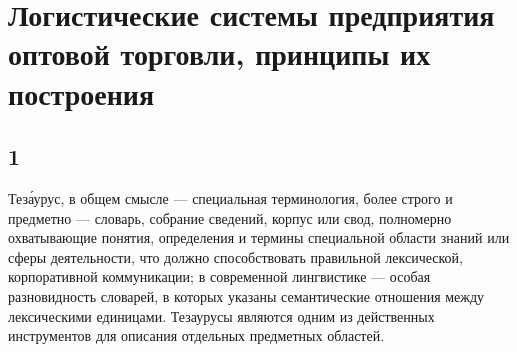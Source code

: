 \section{Логистические системы предприятия оптовой торговли, принципы их построения}
\subsection{1}
Теза́урус, в общем смысле — специальная терминология, более строго и предметно — словарь, собрание сведений, корпус или свод, полномерно охватывающие понятия, определения и термины специальной области знаний или сферы деятельности, что должно способствовать правильной лексической, корпоративной коммуникации; в современной лингвистике — особая разновидность словарей, в которых указаны семантические отношения между лексическими единицами. Тезаурусы являются одним из действенных инструментов для описания отдельных предметных областей.